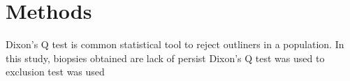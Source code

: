 \chapter{Methods}

Dixon's Q test is common statistical tool to reject outliners in a population. In this study, biopsies obtained are lack of persist Dixon's Q test was used to   exclusion test was used 